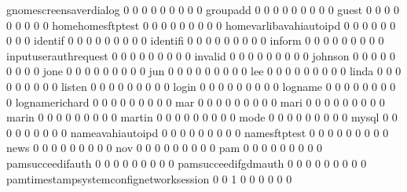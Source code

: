\documentclass[compress,8pt]{beamer}
\begin{document}
\begin{frame}
\begin{Schunk}
  gnomescreensaverdialog                     0   0   0   0   0   0   0   0   0
  groupadd                                   0   0   0   0   0   0   0   0   0
  guest                                      0   0   0   0   0   0   0   0   0
  homehomesftptest                           0   0   0   0   0   0   0   0   0
  homevarlibavahiautoipd                     0   0   0   0   0   0   0   0   0
  identif                                    0   0   0   0   0   0   0   0   0
  identifi                                   0   0   0   0   0   0   0   0   0
  inform                                     0   0   0   0   0   0   0   0   0
  inputuserauthrequest                       0   0   0   0   0   0   0   0   0
  invalid                                    0   0   0   0   0   0   0   0   0
  johnson                                    0   0   0   0   0   0   0   0   0
  jone                                       0   0   0   0   0   0   0   0   0
  jun                                        0   0   0   0   0   0   0   0   0
  lee                                        0   0   0   0   0   0   0   0   0
  linda                                      0   0   0   0   0   0   0   0   0
  listen                                     0   0   0   0   0   0   0   0   0
  login                                      0   0   0   0   0   0   0   0   0
  logname                                    0   0   0   0   0   0   0   0   0
  lognamerichard                             0   0   0   0   0   0   0   0   0
  mar                                        0   0   0   0   0   0   0   0   0
  mari                                       0   0   0   0   0   0   0   0   0
  marin                                      0   0   0   0   0   0   0   0   0
  martin                                     0   0   0   0   0   0   0   0   0
  mode                                       0   0   0   0   0   0   0   0   0
  mysql                                      0   0   0   0   0   0   0   0   0
  nameavahiautoipd                           0   0   0   0   0   0   0   0   0
  namesftptest                               0   0   0   0   0   0   0   0   0
  news                                       0   0   0   0   0   0   0   0   0
  nov                                        0   0   0   0   0   0   0   0   0
  pam                                        0   0   0   0   0   0   0   0   0
  pamsucceedifauth                           0   0   0   0   0   0   0   0   0
  pamsucceedifgdmauth                        0   0   0   0   0   0   0   0   0
  pamtimestampsystemconfignetworksession     0   0   1   0   0   0   0   0   0

\end{Schunk}
\end{frame}
\end{document}
